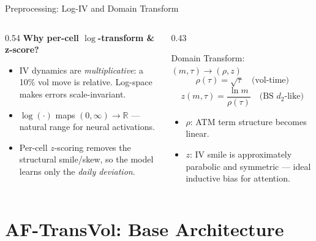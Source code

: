 \documentclass[aspectratio=169,10pt]{beamer}
\begin{document}
\begin{frame}{Preprocessing: Log-IV and Domain Transform}
  \begin{columns}[T]
    \begin{column}{0.54\textwidth}
      \textbf{Why per-cell $\log$-transform \& z-score?}
      \begin{itemize}\itemsep4pt
        \item IV dynamics are \emph{multiplicative}: a 10\% vol move is relative. Log-space makes errors scale-invariant.
        \item $\log(\cdot)$ maps $(0,\infty)\to\mathbb{R}$ --- natural range for neural activations.
        \item Per-cell $z$-scoring removes the structural smile/skew, so the model learns only the \emph{daily deviation}.
      \end{itemize}
    \end{column}
    \begin{column}{0.43\textwidth}
      \begin{block}{Domain Transform: $(m,\tau)\to(\rho,z)$}
        \footnotesize
        \[
          \rho(\tau)=\sqrt{\tau}\quad\text{(vol-time)}
        \]
        \[
          z(m,\tau)=\frac{\ln m}{\rho(\tau)}\quad\text{(BS }d_2\text{-like)}
        \]
        \begin{itemize}
          \item $\rho$: ATM term structure becomes linear.
          \item $z$: IV smile is approximately parabolic and symmetric --- ideal inductive bias for attention.
        \end{itemize}
      \end{block}
    \end{column}
  \end{columns}
\end{frame}

\section{AF-TransVol: Base Architecture}
\end{document}

